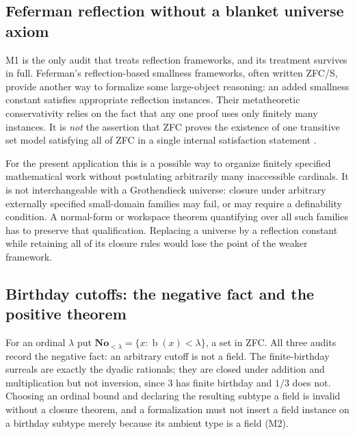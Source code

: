 \documentclass[11pt,letterpaper]{article}
\numberwithin{equation}{section}
\theoremstyle{definition}
\theoremstyle{remark}
\newcommand{\No}{\mathbf{No}}
\newcommand{\bd}{\operatorname{b}}
\begin{document}
\subsection{Feferman reflection without a blanket universe axiom}
\label{found:sub:reflection}
M1 is the only audit that treats reflection frameworks, and its treatment
survives in full. Feferman's reflection-based smallness frameworks, often
written ZFC/S, provide another way to formalize some large-object reasoning: an
added smallness constant satisfies appropriate reflection instances. Their
metatheoretic conservativity relies on the fact that any one proof uses only
finitely many instances. It is \emph{not} the assertion that ZFC proves the
existence of one transitive set model satisfying all of ZFC in a single
internal satisfaction statement \cite[\S11]{found:ShulmanSize}.

For the present application this is a possible way to organize finitely
specified mathematical work without postulating arbitrarily many inaccessible
cardinals. It is not interchangeable with a Grothendieck universe: closure under
arbitrary externally specified small-domain families may fail, or may require a
definability condition. A normal-form or workspace theorem quantifying over all
such families has to preserve that qualification. Replacing a universe by a
reflection constant while retaining all of its closure rules would lose the
point of the weaker framework.

\subsection{Birthday cutoffs: the negative fact and the positive theorem}
\label{found:sub:cutoffs}
For an ordinal $\lambda$ put $\No_{<\lambda}=\{x:\bd(x)<\lambda\}$, a set in
ZFC. All three audits record the negative fact: an arbitrary cutoff is not a
field. The finite-birthday surreals are exactly the dyadic rationals; they are
closed under addition and multiplication but not inversion, since $3$ has finite
birthday and $1/3$ does not. Choosing an ordinal bound and declaring the
resulting subtype a field is invalid without a closure theorem, and a
formalization must not insert a field instance on a birthday subtype merely
because its ambient type is a field (M2).
\end{document}
